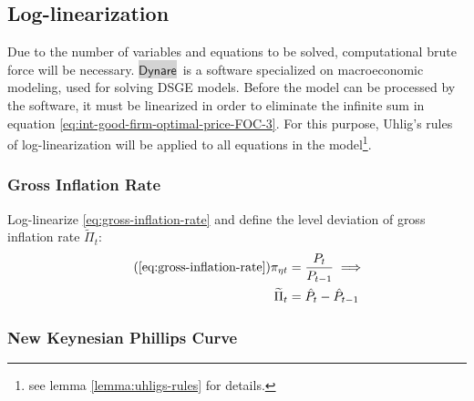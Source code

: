 \documentclass[
	12pt,
	]{article}
\numberwithin{equation}{section}
\newcommand{\dynare}{\colorbox{lightgray}{$\mathsf{Dynare}$}}
\theoremstyle{definition}
\theoremstyle{plain}
\theoremstyle{plain}
\theoremstyle{plain}
\begin{document}


\subsection{Log-linearization}

Due to the number of variables and equations to be solved, computational brute force will be necessary. \dynare \ is a software specialized on macroeconomic modeling, used for solving DSGE models. Before the model can be processed by the software, it must be linearized in order to eliminate the infinite sum in equation \ref{eq:int-good-firm-optimal-price-FOC-3}. For this purpose, Uhlig's rules of log-linearization \cite{uhlig_toolkit_1999} will be applied to all equations in the model\footnote{see lemma \ref{lemma:uhligs-rules} for details.}.


\subsubsection{Gross Inflation Rate}

Log-linearize \ref{eq:gross-inflation-rate} and define the level deviation of gross inflation rate $\widetilde{\Pi}_t$:
\begin{align}
	\tag{\ref{eq:gross-inflation-rate}}
	\pi_{\eta t} &= \frac{P_t}{P_{t-1}} \implies \\
	\widetilde{\Pi}_t &= \hat{P}_t - \hat{P}_{t-1}
	\label{eq:level-dev-gross-inflation-rate}
\end{align}


\subsubsection{New Keynesian Phillips Curve}
\end{document}
